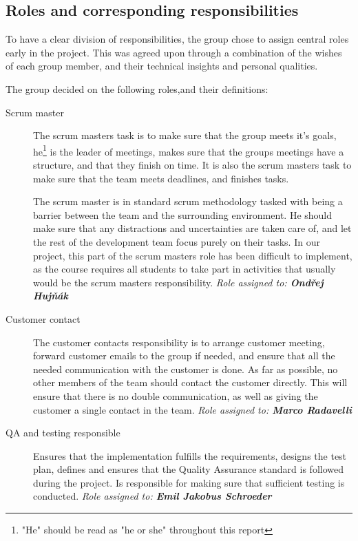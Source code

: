 \documentclass[11pt,a4paper,titlepage,oneside]{report}
\begin{document}
\subsection{Roles and corresponding responsibilities}
To have a clear division of responsibilities, the group chose to assign central roles early in the project. This was agreed upon through a combination of the wishes of each group member, and their technical insights and personal qualities. 

The group decided on the following roles,and their definitions:
\begin{description}
\item[Scrum master] The scrum masters task is to make sure that the group meets it's goals, he\footnote{"He" should be read as "he or she" throughout this report} is the leader of meetings, makes sure that the groups meetings have a structure, and that they finish on time. It is also the scrum masters task to make sure that the team meets deadlines, and finishes tasks. 

The scrum master is in standard scrum methodology tasked with being a barrier between the team and the surrounding environment. He should make sure that any distractions and uncertainties are taken care of, and let the rest of the development team focus purely on their tasks. In our project, this part of the scrum masters role has been difficult to implement, as the course requires all students to take part in activities that usually would be the scrum masters responsibility. 
\emph{Role assigned to: \textbf{Ondřej Hujňák}}

\item[Customer contact] The customer contacts responsibility is to arrange customer meeting, forward customer emails to the group if needed, and ensure that all the needed communication with the customer is done. As far as possible, no other members of the team should contact the customer directly. This will ensure that there is no double communication, as well as giving the customer a single contact in the team.
\emph{Role assigned to: \textbf{Marco Radavelli}}

\item[QA and testing responsible] Ensures that the implementation fulfills the requirements, designs the test plan, defines and ensures that the Quality Assurance standard is followed during the project. Is responsible for making sure that sufficient testing is conducted.
\emph{Role assigned to: \textbf{Emil Jakobus Schroeder}}


\end{description}
\end{document}
